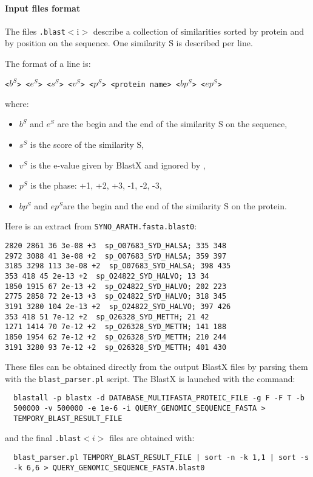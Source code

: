 \paragraph{Input files format}

The files \texttt{.blast}$<$i$>$ describe a collection of similarities
sorted by protein and by position on the sequence. One similarity S is
described per line.

The format of a line is:

\texttt{<$b^S$> <$e^S$> <$s^S$> <$v^S$> <$p^S$> <protein name> <$bp^S$> <$ep^S$>}

where:
\begin{itemize}
\item $b^S$ and $e^S$ are the begin and the end of the similarity S on the sequence,
\item $s^S$ is the score of the similarity S,
\item $v^S$ is the e-value given by BlastX and ignored by \EuGene,
\item $p^S$ is the phase: +1, +2, +3, -1, -2, -3,
\item $bp^S$ and $ep^S$are the begin and the end of the similarity S on the protein.
\end{itemize}

Here is an extract from \texttt{SYNO\_ARATH.fasta.blast0}:
\begin{Verbatim}[fontsize=\small]
2820 2861 36 3e-08 +3  sp_O07683_SYD_HALSA; 335 348
2972 3088 41 3e-08 +2  sp_O07683_SYD_HALSA; 359 397
3185 3298 113 3e-08 +2  sp_O07683_SYD_HALSA; 398 435
353 418 45 2e-13 +2  sp_O24822_SYD_HALVO; 13 34
1850 1915 67 2e-13 +2  sp_O24822_SYD_HALVO; 202 223
2775 2858 72 2e-13 +3  sp_O24822_SYD_HALVO; 318 345
3191 3280 104 2e-13 +2  sp_O24822_SYD_HALVO; 397 426
353 418 51 7e-12 +2  sp_O26328_SYD_METTH; 21 42
1271 1414 70 7e-12 +2  sp_O26328_SYD_METTH; 141 188
1850 1954 62 7e-12 +2  sp_O26328_SYD_METTH; 210 244
3191 3280 93 7e-12 +2  sp_O26328_SYD_METTH; 401 430
\end{Verbatim}
These files can be obtained directly from the output BlastX files by
parsing them with the \texttt{blast\_parser.pl} script.
The BlastX is launched with the command:
\begin{Verbatim}
  blastall -p blastx -d DATABASE_MULTIFASTA_PROTEIC_FILE -g F -F T -b
  500000 -v 500000 -e 1e-6 -i QUERY_GENOMIC_SEQUENCE_FASTA >
  TEMPORY_BLAST_RESULT_FILE
\end{Verbatim}
and the final \texttt{.blast}$<i>$ files are obtained with:
\begin{Verbatim}
  blast_parser.pl TEMPORY_BLAST_RESULT_FILE | sort -n -k 1,1 | sort -s
  -k 6,6 > QUERY_GENOMIC_SEQUENCE_FASTA.blast0
\end{Verbatim}

